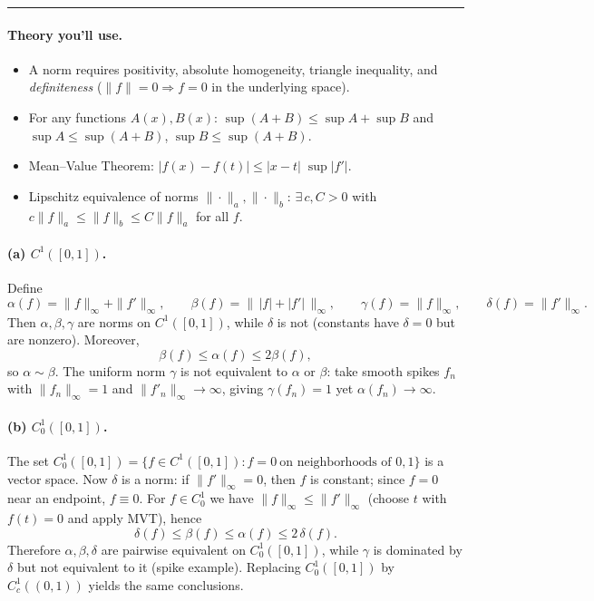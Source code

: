 \documentclass[12pt,a4paper]{article}
\theoremstyle{plain}
\theoremstyle{definition}
\theoremstyle{remark}
\theoremstyle{remark}
\begin{document}
\noindent\rule{\linewidth}{0.6pt}

\paragraph{Theory you’ll use.}
\begin{itemize}
	\item A norm requires positivity, absolute homogeneity, triangle inequality, and
	\emph{definiteness} ($\|f\|=0\Rightarrow f=0$ in the underlying space).
	\item For any functions $A(x),B(x)$:
	$\sup(A+B)\le \sup A+\sup B$ and $\sup A\le \sup(A+B)$, $\sup B\le \sup(A+B)$.
	\item Mean–Value Theorem: $|f(x)-f(t)|\le |x-t|\;\sup|f'|$.
	\item Lipschitz equivalence of norms $\|\cdot\|_a,\|\cdot\|_b$:
	$\exists\,c,C>0$ with $c\|f\|_a\le \|f\|_b\le C\|f\|_a$ for all $f$.
\end{itemize}

\paragraph{(a) $C^1([0,1])$.}
Define
\[
\alpha(f)=\|f\|_\infty+\|f'\|_\infty,\qquad
\beta(f)=\big\|\,|f|+|f'|\,\big\|_\infty,\qquad
\gamma(f)=\|f\|_\infty,\qquad
\delta(f)=\|f'\|_\infty.
\]
Then $\alpha,\beta,\gamma$ are norms on $C^1([0,1])$, while $\delta$ is not (constants have
$\delta=0$ but are nonzero). Moreover,
\[
\beta(f)\le \alpha(f)\le 2\beta(f),
\]
so $\alpha\sim\beta$. The uniform norm $\gamma$ is not equivalent to $\alpha$ or $\beta$:
take smooth spikes $f_n$ with $\|f_n\|_\infty=1$ and $\|f'_n\|_\infty\to\infty$, giving
$\gamma(f_n)=1$ yet $\alpha(f_n)\to\infty$.

\paragraph{(b) $C^1_0([0,1])$.}
The set $C^1_0([0,1])=\{f\in C^1([0,1]): f=0\ \text{on neighborhoods of }0,1\}$ is a vector space.
Now $\delta$ is a norm: if $\|f'\|_\infty=0$, then $f$ is constant; since $f=0$ near an endpoint,
$f\equiv0$. For $f\in C^1_0$ we have $\|f\|_\infty\le \|f'\|_\infty$ (choose $t$ with $f(t)=0$ and apply MVT),
hence
\[
\delta(f)\le \beta(f)\le \alpha(f)\le 2\,\delta(f).
\]
Therefore $\alpha,\beta,\delta$ are pairwise equivalent on $C^1_0([0,1])$, while $\gamma$
is dominated by $\delta$ but not equivalent to it (spike example).
Replacing $C^1_0([0,1])$ by $C^1_c((0,1))$ yields the same conclusions.
\end{document}

